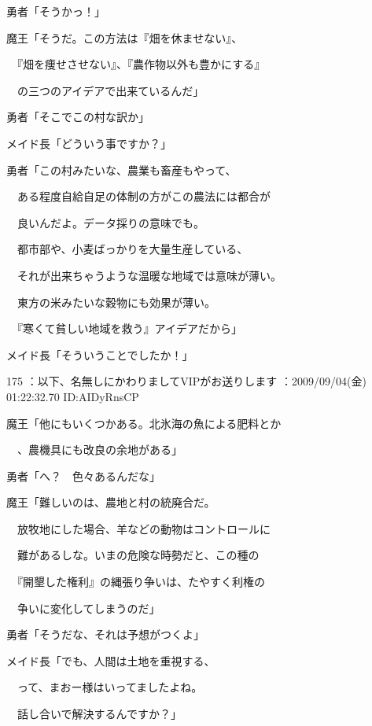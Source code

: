 \documentclass[a4j,twocolumn]{tarticle}
\begin{document}
勇者「そうかっ！」 



魔王「そうだ。この方法は『畑を休ませない』、\par{} 
　『畑を痩せさせない』、『農作物以外も豊かにする』\par{} 
　の三つのアイデアで出来ているんだ」 



勇者「そこでこの村な訳か」 



メイド長「どういう事ですか？」 



勇者「この村みたいな、農業も畜産もやって、\par{} 
　ある程度自給自足の体制の方がこの農法には都合が\par{} 
　良いんだよ。データ採りの意味でも。\par{} 
　都市部や、小麦ばっかりを大量生産している、\par{} 
　それが出来ちゃうような温暖な地域では意味が薄い。\par{} 
　東方の米みたいな穀物にも効果が薄い。\par{} 
　『寒くて貧しい地域を救う』アイデアだから」 



メイド長「そういうことでしたか！」 

	
    
    

175 ：以下、名無しにかわりましてVIPがお送りします ：2009/09/04(金) 01:22:32.70 ID:AIDyRnsCP 


魔王「他にもいくつかある。北氷海の魚による肥料とか\par{} 
　、農機具にも改良の余地がある」 



勇者「へ？　色々あるんだな」 



魔王「難しいのは、農地と村の統廃合だ。\par{} 
　放牧地にした場合、羊などの動物はコントロールに\par{} 
　難があるしな。いまの危険な時勢だと、この種の\par{} 
　『開墾した権利』の縄張り争いは、たやすく利権の \par{}
　争いに変化してしまうのだ」 



勇者「そうだな、それは予想がつくよ」 



メイド長「でも、人間は土地を重視する、\par{} 
　って、まおー様はいってましたよね。\par{} 
　話し合いで解決するんですか？」 
\end{document}
